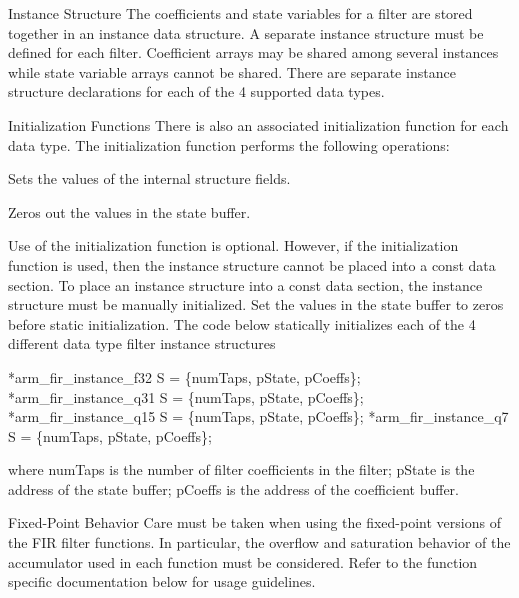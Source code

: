 \begin{DoxyParagraph}{Instance Structure }
The coefficients and state variables for a filter are stored together in an instance data structure. A separate instance structure must be defined for each filter. Coefficient arrays may be shared among several instances while state variable arrays cannot be shared. There are separate instance structure declarations for each of the 4 supported data types.
\end{DoxyParagraph}
\begin{DoxyParagraph}{Initialization Functions }
There is also an associated initialization function for each data type. The initialization function performs the following operations\-:
\begin{DoxyItemize}
\item Sets the values of the internal structure fields.
\item Zeros out the values in the state buffer.
\end{DoxyItemize}
\end{DoxyParagraph}
\begin{DoxyParagraph}{}
Use of the initialization function is optional. However, if the initialization function is used, then the instance structure cannot be placed into a const data section. To place an instance structure into a const data section, the instance structure must be manually initialized. Set the values in the state buffer to zeros before static initialization. The code below statically initializes each of the 4 different data type filter instance structures 
\begin{DoxyPre}  
*arm\_fir\_instance\_f32 S = \{numTaps, pState, pCoeffs\};  
*arm\_fir\_instance\_q31 S = \{numTaps, pState, pCoeffs\};  
*arm\_fir\_instance\_q15 S = \{numTaps, pState, pCoeffs\};  
*arm\_fir\_instance\_q7 S =  \{numTaps, pState, pCoeffs\};  
  \end{DoxyPre}

\end{DoxyParagraph}
where {\ttfamily num\-Taps} is the number of filter coefficients in the filter; {\ttfamily p\-State} is the address of the state buffer; {\ttfamily p\-Coeffs} is the address of the coefficient buffer.

\begin{DoxyParagraph}{Fixed-\/\-Point Behavior }
Care must be taken when using the fixed-\/point versions of the F\-I\-R filter functions. In particular, the overflow and saturation behavior of the accumulator used in each function must be considered. Refer to the function specific documentation below for usage guidelines. 
\end{DoxyParagraph}


